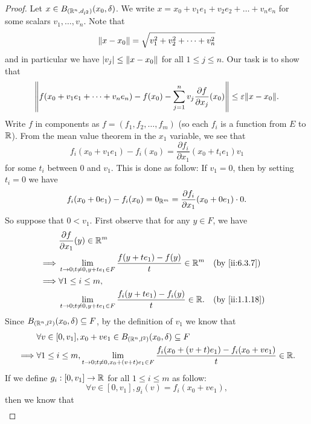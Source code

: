 \begin{proof}
  Let \(x \in B_{(\R^n, d_{l^2})}(x_0, \delta)\).
  We write \(x = x_0 + v_1 e_1 + v_2 e_2 + \dots + v_n e_n\) for some scalars \(v_1, \dots, v_n\).
  Note that
  \[
    \norm*{x - x_0} = \sqrt{v_1^2 + v_2^2 + \dots + v_n^2}
  \]
  and in particular we have \(\abs{v_j} \leq \norm*{x - x_0}\) for all \(1 \leq j \leq n\).
  Our task is to show that
  \[
    \norm*{f(x_0 + v_1 e_1 + \dots + v_n e_n) - f(x_0) - \sum_{j = 1}^n v_j \dfrac{\partial f}{\partial x_j}(x_0)} \leq \varepsilon \norm*{x - x_0}.
  \]
  Write \(f\) in components as \(f = (f_1 , f_2, \dots, f_m)\)
  (so each \(f_i\) is a function from \(E\) to \(\R\)).
  From the mean value theorem in the \(x_1\) variable, we see that
  \[
    f_i(x_0 + v_1 e_1) - f_i(x_0) = \dfrac{\partial f_i}{\partial x_1}(x_0 + t_i e_1) v_1
  \]
  for some \(t_i\) between \(0\) and \(v_1\).
  This is done as follow:
  If \(v_1 = 0\), then by setting \(t_i = 0\) we have
  \[
    f_i(x_0 + 0 e_1) - f_i(x_0) = 0_{\R^m} = \dfrac{\partial f_i}{\partial x_1}(x_0 + 0 e_1) \cdot 0.
  \]
  So suppose that \(0 < v_1\).
  First observe that for any \(y \in F\), we have
  \begin{align*}
             & \dfrac{\partial f}{\partial x_1}(y) \in \R^m                                                           \\
    \implies & \lim_{t \to 0 ; t \neq 0, y + t e_1 \in F} \dfrac{f(y + t e_1) - f(y)}{t} \in \R^m    &  & \by{ii:6.3.7}  \\
    \implies & \forall 1 \leq i \leq m,                                                                               \\
             & \lim_{t \to 0 ; t \neq 0, y + t e_1 \in F} \dfrac{f_i(y + t e_1) - f_i(y)}{t} \in \R. &  & \by{ii:1.1.18}
  \end{align*}
  Since \(B_{(\R^n, l^2)}(x_0, \delta) \subseteq F\), by the definition of \(v_1\) we know that
  \begin{align*}
             & \forall v \in [0, v_1], x_0 + v e_1 \in B_{(\R^n, l^2)}(x_0, \delta) \subseteq F                                                         \\
    \implies & \forall 1 \leq i \leq m, \lim_{t \to 0 ; t \neq 0, x_0 + (v + t) e_1 \in F} \dfrac{f_i(x_0 + (v + t) e_1) - f_i(x_0 + v e_1)}{t} \in \R.
  \end{align*}
  If we define \(g_i : [0, v_1] \to \R\) for all \(1 \leq i \leq m\) as follow:
  \[
    \forall v \in [0, v_1], g_i(v) = f_i(x_0 + v e_1),
  \]
  then we know that
  \begin{align*}

\end{align*}
\end{proof}
